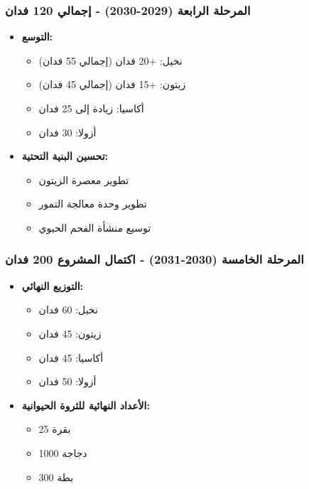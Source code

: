 \subsubsection{المرحلة الرابعة (2029-2030) - إجمالي 120 فدان}
\begin{itemize}
    \item \textbf{التوسع:}
    \begin{itemize}
        \item نخيل: +20 فدان (إجمالي 55 فدان)
        \item زيتون: +15 فدان (إجمالي 45 فدان)
        \item أكاسيا: زيادة إلى 25 فدان
        \item أزولا: 30 فدان
    \end{itemize}
    
    \item \textbf{تحسين البنية التحتية:}
    \begin{itemize}
        \item تطوير معصرة الزيتون
        \item تطوير وحدة معالجة التمور
        \item توسيع منشأة الفحم الحيوي
    \end{itemize}
\end{itemize}

\subsubsection{المرحلة الخامسة (2030-2031) - اكتمال المشروع 200 فدان}
\begin{itemize}
    \item \textbf{التوزيع النهائي:}
    \begin{itemize}
        \item نخيل: 60 فدان
        \item زيتون: 45 فدان
        \item أكاسيا: 45 فدان
        \item أزولا: 50 فدان
    \end{itemize}
    
    \item \textbf{الأعداد النهائية للثروة الحيوانية:}
    \begin{itemize}
        \item 25 بقرة
        \item 1000 دجاجة
        \item 300 بطة
    \end{itemize}
\end{itemize}

